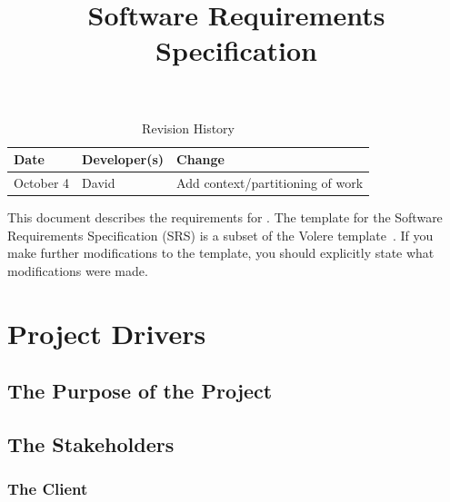\documentclass[12pt]{article}
\title{Software Requirements Specification\\\progname}
\author{\authname}
\date{}
\begin{document}
\maketitle

\newpage
{}

\tableofcontents

\newpage

\begin{table}[hp]
\caption{Revision History} \label{TblRevisionHistory}
\begin{tabularx}{\textwidth}{llX}
\toprule
\textbf{Date} & \textbf{Developer(s)} & \textbf{Change}\\
\midrule
October 4 & David & Add context/partitioning of work\\
\bottomrule
\end{tabularx}
\end{table}

\newpage

\listoftables
\listoffigures

\newpage


This document describes the requirements for \progname. The template for the Software
Requirements Specification (SRS) is a subset of the Volere
template~\cite{RobertsonAndRobertson2012}. If you make further modifications
to the template, you should explicitly state what modifications were made.

\begin{table}

\end{table}

\section{Project Drivers}

\subsection{The Purpose of the Project}

\subsection{The Stakeholders}

\subsubsection{The Client}
\end{document}
